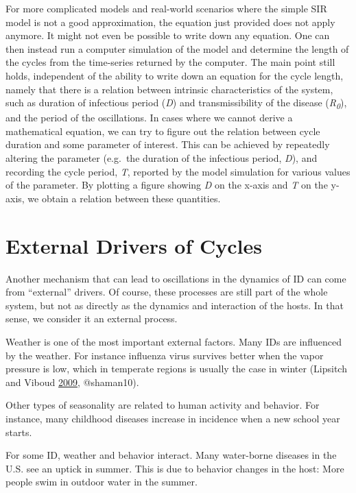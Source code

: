 \documentclass[
]{book}
\begin{document}
For more complicated models and real-world scenarios where the simple SIR model is not a good approximation, the equation just provided does not apply anymore. It might not even be possible to write down any equation. One can then instead run a computer simulation of the model and determine the length of the cycles from the time-series returned by the computer. The main point still holds, independent of the ability to write down an equation for the cycle length, namely that there is a relation between intrinsic characteristics of the system, such as duration of infectious period (\emph{D}) and transmissibility of the disease (\emph{R\textsubscript{0}}), and the period of the oscillations. In cases where we cannot derive a mathematical equation, we can try to figure out the relation between cycle duration and some parameter of interest. This can be achieved by repeatedly altering the parameter (e.g.~the duration of the infectious period, \emph{D}), and recording the cycle period, \emph{T}, reported by the model simulation for various values of the parameter. By plotting a figure showing \emph{D} on the x-axis and \emph{T} on the y-axis, we obtain a relation between these quantities.

\hypertarget{external-drivers-of-cycles}{%
\section{External Drivers of Cycles}\label{external-drivers-of-cycles}}

Another mechanism that can lead to oscillations in the dynamics of ID can come from ``external'' drivers. Of course, these processes are still part of the whole system, but not as directly as the dynamics and interaction of the hosts. In that sense, we consider it an external process.

Weather is one of the most important external factors. Many IDs are influenced by the weather. For instance influenza virus survives better when the vapor pressure is low, which in temperate regions is usually the case in winter (Lipsitch and Viboud \protect\hyperlink{ref-lipsitch09}{2009}, @shaman10).

Other types of seasonality are related to human activity and behavior. For instance, many childhood diseases increase in incidence when a new school year starts.

For some ID, weather and behavior interact. Many water-borne diseases in the U.S. see an uptick in summer. This is due to behavior changes in the host: More people swim in outdoor water in the summer.
\end{document}

